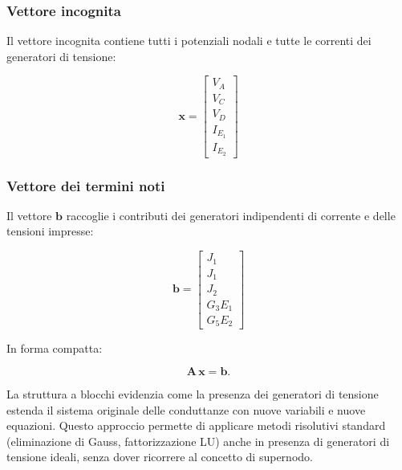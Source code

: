 \subsubsection*{Vettore incognita}

Il vettore incognita contiene tutti i potenziali nodali e tutte le correnti dei generatori di tensione:

\begin{equation}
    \mathbf{x} = 
    \begin{bmatrix}
        V_A \\ V_C \\ V_D \\ I_{E_1} \\ I_{E_2}
    \end{bmatrix}
\end{equation}

\subsubsection*{Vettore dei termini noti}

Il vettore \(\mathbf{b}\) raccoglie i contributi dei generatori indipendenti di corrente e delle tensioni impresse:

\begin{equation}
    \mathbf{b} = 
    \begin{bmatrix}
    J_1 \\ J_1 \\ J_2 \\ G_3E_1 \\ G_5E_2
    \end{bmatrix}
\end{equation}

In forma compatta:

\begin{equation}
    \mathbf{A} \, \mathbf{x} = \mathbf{b}.
\end{equation}

La struttura a blocchi evidenzia come la presenza dei generatori di tensione estenda il sistema originale delle conduttanze con nuove variabili e nuove equazioni. Questo approccio permette di applicare metodi risolutivi standard (eliminazione di Gauss, fattorizzazione LU) anche in presenza di generatori di tensione ideali, senza dover ricorrere al concetto di supernodo.